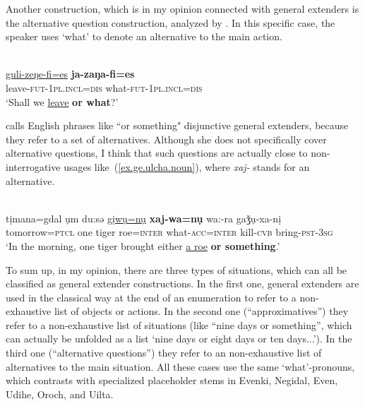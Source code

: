 \documentclass[output=paper,colorlinks,citecolor=brown
\ChapterDOI{10.5281/zenodo.15697577}
]{langscibook}
\begin{document}
Another construction, which is in my opinion connected with general extenders is the alternative question construction, analyzed by \citet{tolskaya2008question}. In this specific case, the speaker uses `what' to denote an alternative to the main action.

 \ea \label{ex.ge.ude.question}
 \\
\gll \uline{guli-zeŋe-fi=es} \textbf{ja-zaŋa-fi=es}\\
leave-\textsc{fut}-\textsc{1pl.incl}=\textsc{dis} what-\textsc{fut}-\textsc{1pl.incl}=\textsc{dis}\\
\glt `Shall we \uline{leave} \textbf{or what}?' \\
 \z
{}

\citet{overstreet2020english} calls English phrases like ``or something" disjunctive general extenders, because they refer to a set of alternatives. Although she does not specifically cover alternative questions, I think that such questions are actually close to non-interrogative usages like~(\ref{ex.ge.ulcha.noun}), where \textit{xaj-} stands for an alternative.

 \ea \label{ex.ge.ulcha.noun}
 \\
\gll tịmana=gdal ụm du:sə \uline{gịwụ=nụ} \textbf{xaj-wa=nụ} wa:-ra gaǯụ-xa-nị\\
tomorrow=\textsc{ptcl} one tiger roe=\textsc{inter} what-\textsc{acc}=\textsc{inter} kill-\textsc{cvb} bring-\textsc{pst}-\textsc{3sg}\\
\glt `In the morning, one tiger brought either \uline{a roe} \textbf{or something}.' \\
 \z
{}

To sum up, in my opinion, there are three types of situations, which can all be classified as general extender constructions. In the first one, general extenders are used in the classical way at the end of an enumeration to refer to a non-exhaustive list of objects or actions. In the second one (``approximatives'') they refer to a non-exhaustive list of situations (like ``nine days or something'', which can actually be unfolded as a list `nine days or eight days or ten days...'). In the third one (``alternative questions'') they refer to an non-exhaustive list of alternatives to the main situation. All these cases use the same `what'-pronouns, which contrasts with specialized placeholder stems in Evenki, Negidal, Even, Udihe, Oroch, and Uilta.
\end{document}
